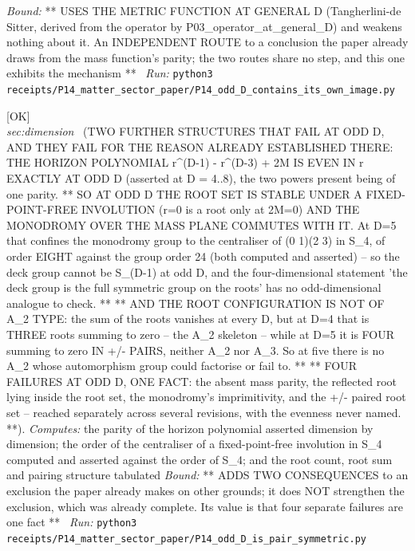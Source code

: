 \begin{description}
 \emph{Bound:} ** USES THE METRIC FUNCTION AT GENERAL D (Tangherlini-de Sitter, derived from the operator by P03\_operator\_at\_general\_D) and weakens nothing about it. An INDEPENDENT ROUTE to a conclusion the paper already draws from the mass function's parity; the two routes share no step, and this one exhibits the mechanism **
\ \emph{Run:} \texttt{python3 receipts/P14\_matter\_sector\_paper/P14\_odd\_D\_contains\_its\_own\_image.py}
\item[\rcptlabel{P14_odd_D_is_pair_symmetric}{P14R43}\textbf{P14R43}\quad\texttt{P14\_odd\_D\_is\_pair\_symmetric}]\hfill\textsf{[OK]}\\
\textit{sec:dimension} \ (TWO FURTHER STRUCTURES THAT FAIL AT ODD D, AND THEY FAIL FOR THE REASON ALREADY ESTABLISHED THERE: THE HORIZON POLYNOMIAL r\textasciicircum{}(D-1) - r\textasciicircum{}(D-3) + 2M IS EVEN IN r EXACTLY AT ODD D (asserted at D = 4..8), the two powers present being of one parity. ** SO AT ODD D THE ROOT SET IS STABLE UNDER A FIXED-POINT-FREE INVOLUTION (r=0 is a root only at 2M=0) AND THE MONODROMY OVER THE MASS PLANE COMMUTES WITH IT. At D=5 that confines the monodromy group to the centraliser of (0 1)(2 3) in S\_4, of order EIGHT against the group order 24 (both computed and asserted) -- so the deck group cannot be S\_(D-1) at odd D, and the four-dimensional statement 'the deck group is the full symmetric group on the roots' has no odd-dimensional analogue to check. ** ** AND THE ROOT CONFIGURATION IS NOT OF A\_2 TYPE: the sum of the roots vanishes at every D, but at D=4 that is THREE roots summing to zero -- the A\_2 skeleton -- while at D=5 it is FOUR summing to zero IN +/- PAIRS, neither A\_2 nor A\_3. So at five there is no A\_2 whose automorphism group could factorise or fail to. ** ** FOUR FAILURES AT ODD D, ONE FACT: the absent mass parity, the reflected root lying inside the root set, the monodromy's imprimitivity, and the +/- paired root set -- reached separately across several revisions, with the evenness never named. **). 
\emph{Computes:} the parity of the horizon polynomial asserted dimension by dimension; the order of the centraliser of a fixed-point-free involution in S\_4 computed and asserted against the order of S\_4; and the root count, root sum and pairing structure tabulated
 \emph{Bound:} ** ADDS TWO CONSEQUENCES to an exclusion the paper already makes on other grounds; it does NOT strengthen the exclusion, which was already complete. Its value is that four separate failures are one fact **
\ \emph{Run:} \texttt{python3 receipts/P14\_matter\_sector\_paper/P14\_odd\_D\_is\_pair\_symmetric.py}

\end{description}
